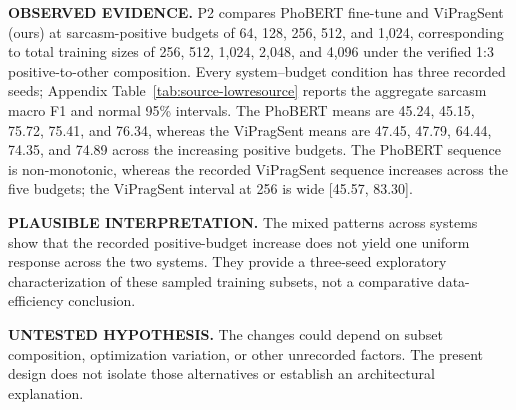 \textbf{OBSERVED EVIDENCE.} P2 compares PhoBERT fine-tune and ViPragSent (ours) at sarcasm-positive budgets of 64, 128, 256, 512, and 1,024, corresponding to total training sizes of 256, 512, 1,024, 2,048, and 4,096 under the verified 1:3 positive-to-other composition. Every system--budget condition has three recorded seeds; Appendix Table~\ref{tab:source-lowresource} reports the aggregate sarcasm macro F1 and normal 95\% intervals.
The PhoBERT means are 45.24, 45.15, 75.72, 75.41, and 76.34, whereas the ViPragSent means are 47.45, 47.79, 64.44, 74.35, and 74.89 across the increasing positive budgets. The PhoBERT sequence is non-monotonic, whereas the recorded ViPragSent sequence increases across the five budgets; the ViPragSent interval at 256 is wide [45.57, 83.30].

\textbf{PLAUSIBLE INTERPRETATION.} The mixed patterns across systems show that the recorded positive-budget increase does not yield one uniform response across the two systems. They provide a three-seed exploratory characterization of these sampled training subsets, not a comparative data-efficiency conclusion.

\textbf{UNTESTED HYPOTHESIS.} The changes could depend on subset composition, optimization variation, or other unrecorded factors. The present design does not isolate those alternatives or establish an architectural explanation.
